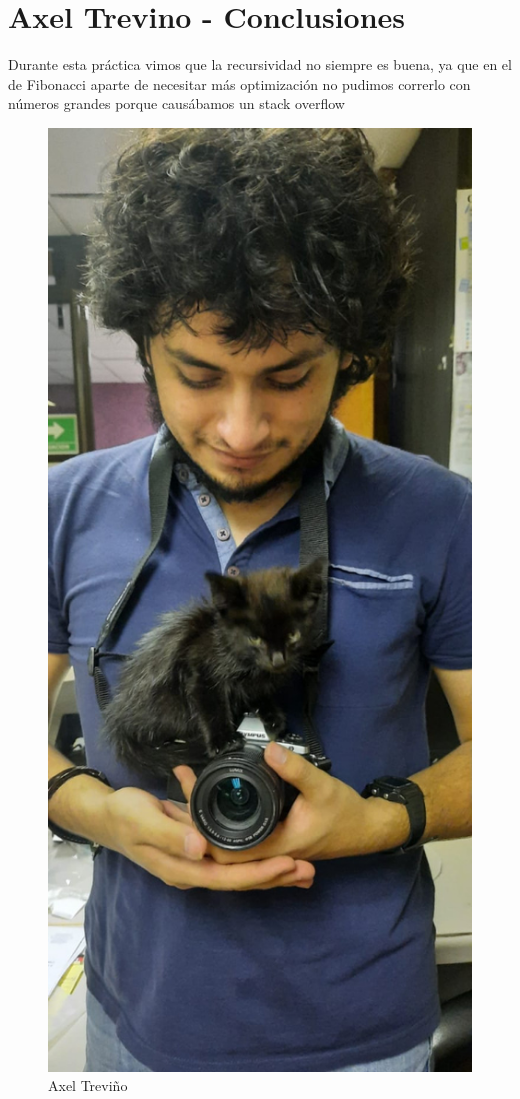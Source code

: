 \newpage
\section{Axel Trevino - Conclusiones}
    Durante esta práctica vimos que la recursividad no siempre es buena, ya que en el de Fibonacci aparte de necesitar más optimización no pudimos correrlo con números grandes porque causábamos un stack overflow
    \begin{figure}[htp!]
            \centering
            \includegraphics[width=0.4 \textwidth]{Images/Fotos_Alumnos/axel.jpg}  
            \caption{Axel Treviño}
            \label{fig:my_label2}
        \end{figure}
